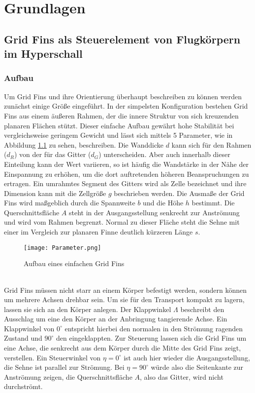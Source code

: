 \chapter{Grundlagen}
\label{sec:grundlagen}

\section{Grid Fins als Steuerelement von Flugkörpern im Hyperschall}
\subsection{Aufbau}
Um Grid Fins und ihre Orientierung überhaupt beschreiben zu können werden zunächst einige Größe eingeführt.
In der simpelsten Konfiguration bestehen Grid Fins aus einem äußeren Rahmen, der die innere Struktur von sich kreuzenden planaren Flächen stützt. Dieser einfache Aufbau gewährt hohe Stabilität bei vergleichsweise geringem Gewicht \cite{zellform} und lässt sich mittels 5 Parameter, wie in Abbildung \ref{abb_parameter} zu sehen, beschreiben. Die Wanddicke $d$ kann sich für den Rahmen ($d_R$) von der für das Gitter ($d_G$) unterscheiden. Aber auch innerhalb dieser Einteilung kann der Wert variieren, so ist häufig die Wandstärke in der Nähe der Einspannung zu erhöhen, um die dort auftretenden höheren Beanspruchungen zu ertragen. Ein umrahmtes Segment des Gitters wird als Zelle bezeichnet und ihre Dimension kann mit die Zellgröße $g$ beschrieben werden. Die Ausmaße der Grid Fins wird maßgeblich durch die Spannweite $b$ und die Höhe $h$ bestimmt. Die Querschnittsfläche $A$ steht in der Ausgangsstellung senkrecht zur Anströmung und wird vom Rahmen begrenzt. Normal zu dieser Fläche steht die Sehne mit einer im Vergleich zur planaren Finne deutlich kürzeren Länge $s$.\\
\begin{figure}[h]
	\centering
	\texttt{[image: Parameter.png]}
	\caption{Aufbau eines einfachen Grid Fins}
	\label{abb_parameter}
\end{figure}\\
Grid Fins müssen nicht starr an einem Körper befestigt werden, sondern können um mehrere Achsen drehbar sein. Um sie für den Transport kompakt zu lagern, lassen sie sich an den Körper anlegen. Der Klappwinkel $\Lambda$ beschreibt den Ausschlag um eine den Körper an der Anbringung tangierende Achse. Ein Klappwinkel von $0^\circ$ entspricht hierbei den normalen in den Strömung ragenden Zustand und $90^\circ$ den eingeklappten. Zur Steuerung lassen sich die Grid Fins um eine Achse, die senkrecht aus dem Körper durch die Mitte des Grid Fins zeigt, verstellen. Ein Steuerwinkel von $\eta = 0^\circ$ ist auch hier wieder die Ausgangsstellung, die Sehne ist parallel zur Strömung. Bei $\eta = 90^\circ$ würde also die Seitenkante zur Anströmung zeigen, die Querschnittsfläche $A$, also das Gitter, wird nicht durchströmt.
